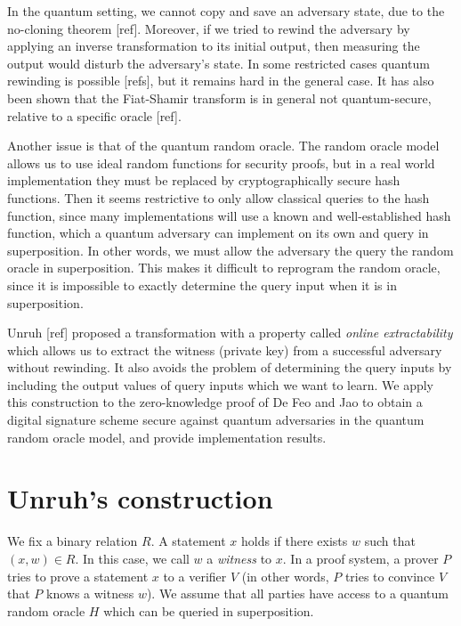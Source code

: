\documentclass{amsart}
\theoremstyle{plain}
\theoremstyle{remark}
\numberwithin{equation}{section}
\begin{document}
In the quantum setting, we cannot copy and save an adversary state, due to the no-cloning theorem [ref]. Moreover, if we tried to rewind the adversary by applying an inverse transformation to its initial output, then measuring the output would disturb the adversary's state. In some restricted cases quantum rewinding is possible [refs], but it remains hard in the general case. It has also been shown that the Fiat-Shamir transform is in general not quantum-secure, relative to a specific oracle [ref].

Another issue is that of the quantum random oracle. The random oracle model allows us to use ideal random functions for security proofs, but in a real world implementation they must be replaced by cryptographically secure hash functions. Then it seems restrictive to only allow classical queries to the hash function, since many implementations will use a known and well-established hash function, which a quantum adversary can implement on its own and query in superposition. In other words, we must allow the adversary the query the random oracle in superposition. This makes it difficult to reprogram the random oracle, since it is impossible to exactly determine the query input when it is in superposition.

Unruh [ref] proposed a transformation with a property called \emph{online extractability} which allows us to extract the witness (private key) from a successful adversary without rewinding. It also avoids the problem of determining the query inputs by including the output values of query inputs which we want to learn. We apply this construction to the zero-knowledge proof of De Feo and Jao to obtain a digital signature scheme secure against quantum adversaries in the quantum random oracle model, and provide implementation results.












\section{Unruh's construction}

We fix a binary relation $R$. A statement $x$ holds if there exists $w$ such that $(x,w) \in R$. In this case, we call $w$ a \emph{witness} to $x$. In a proof system, a prover $P$ tries to prove a statement $x$ to a verifier $V$ (in other words, $P$ tries to convince $V$ that $P$ knows a witness $w$). We assume that all parties have access to a quantum random oracle $H$ which can be queried in superposition.
\end{document}
